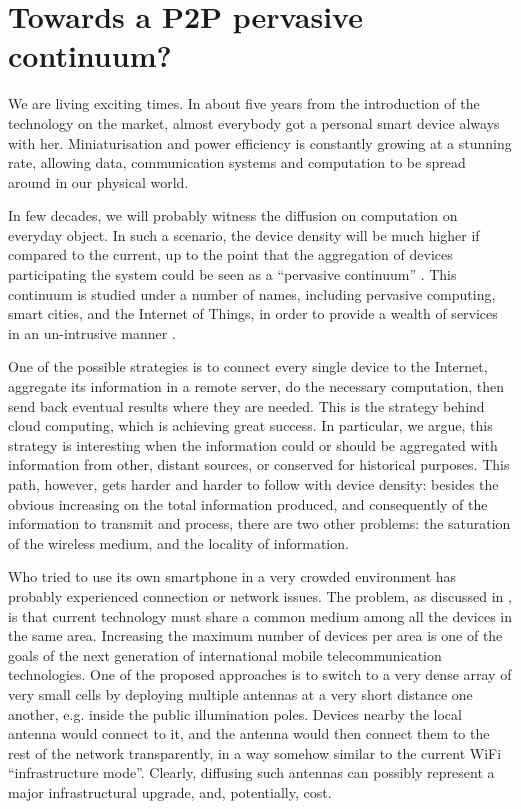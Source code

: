\documentclass[12pt,a4paper,twoside,openright]{book}
\begin{document}
\section{Towards a P2P pervasive continuum?}

We are living exciting times.
%
In about five years from the introduction of the technology on the market, almost everybody got a personal smart device always with her.
%
Miniaturisation and power efficiency is constantly growing at a stunning rate, allowing data, communication systems and computation to be spread around in our physical world.

In few decades, we will probably witness the diffusion on computation on everyday object.
%
In such a scenario, the device density will be much higher if compared to the current, up to the point that the aggregation of devices participating the system could be seen as a ``pervasive continuum'' \cite{sapere-procedia7}.
%
This continuum is studied under a number of names, including pervasive computing, smart cities, and the Internet of Things, in order to provide a wealth of services in an un-intrusive manner \cite{ker2014,Conti12,zam12,Harnie12}.

One of the possible strategies is to connect every single device to the Internet, aggregate its information in a remote server, do the necessary computation, then send back eventual results where they are needed.
%
This is the strategy behind cloud computing, which is achieving great success.
%
In particular, we argue, this strategy is interesting when the information could or should be aggregated with information from other, distant sources, or conserved for historical purposes.
%
This path, however, gets harder and harder to follow with device density: besides the obvious increasing on the total information produced, and consequently of the information to transmit and process, there are two other problems: the saturation of the wireless medium, and the locality of information.

Who tried to use its own smartphone in a very crowded environment has probably experienced connection or network issues.
%
The problem, as discussed in , is that current technology must share a common medium among all the devices in the same area.
%
Increasing the maximum number of devices per area is one of the goals of the next generation of international mobile telecommunication technologies.
%
One of the proposed approaches is to switch to a very dense array of very small cells by deploying multiple antennas at a very short distance one another, e.g. inside the public illumination poles.
%
Devices nearby the local antenna would connect to it, and the antenna would then connect them to the rest of the network transparently, in a way somehow similar to the current WiFi ``infrastructure mode''.
%
Clearly, diffusing such antennas can possibly represent a major infrastructural upgrade, and, potentially, cost.
\end{document}
